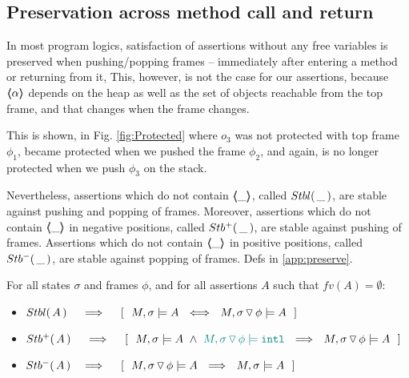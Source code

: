 \subsection{Preservation across method call and return}
In most program logics, satisfaction of assertions without any free variables  is preserved when pushing/popping frames
-- \ie immediately after entering a method or  returning from it,
This, however, is not   the case for our assertions, because  $\langle\!\!\langle \alpha \rangle\!\!\rangle$ depends on the heap as well as the set of objects reachable from the top frame, and  
that changes when the frame changes.
{This is shown, \eg in  Fig. \ref{fig:Protected} where $o_3$ was not protected with top frame $\phi_1$,  
became protected when we pushed the frame $\phi_2$,  and again, is no longer protected when we push $\phi_3$ on the stack. 

 

Nevertheless,  assertions which do  not contain  $\langle\!\!\langle \_ \rangle\!\!\rangle$, called   ${Stbl(\, \_\, )}$, are stable against pushing and popping of frames.  
Moreover, assertions which do  not contain $\langle\!\!\langle \_ \rangle\!\!\rangle$ in negative positions, called ${Stb^+(\, \_\, )}$,  are stable against pushing  of  frames.
Assertions which do  not contain $\langle\!\!\langle \_ \rangle\!\!\rangle$ in positive positions, called ${Stb^-(\, \_ \, )}$,  are stable against popping  of frames.  
\Cf  Defs %
 in \A \ref{app:preserve}.

\begin{lemma}
For all  states $\sigma$ and frames $\phi$, and for all assertions $A$ such that $ fv(A)=\emptyset$:
\label{l:preserve:asrt}
 
\begin{itemize}
\item 
$\Stable{A}\ \ \ \  \Longrightarrow \ \  \ \  [\ \ M, \sigma \models A \ \ \Longleftrightarrow \ \  M,{\PushSLong \phi \sigma} \models A\ \ ]$
\item 
$\Pos{A}\ \ \ \  \Longrightarrow \ \  \ \  [\ \ M, \sigma \models A \  \wedge \  \sdN{M, {\PushSLong \phi \sigma} \models  \intThis} \ \ \Longrightarrow \ \  M,{\PushSLong \phi \sigma} \models A\ \ ]$
\item 
$\Neg{A}\ \ \   \Longrightarrow \ \  \ \  [\ \  M,{\PushSLong \phi \sigma} \models A\ \ \Longrightarrow \ \  M, \sigma \models A   \ \  ]$

\end{itemize}
\end{lemma}
 }
  
